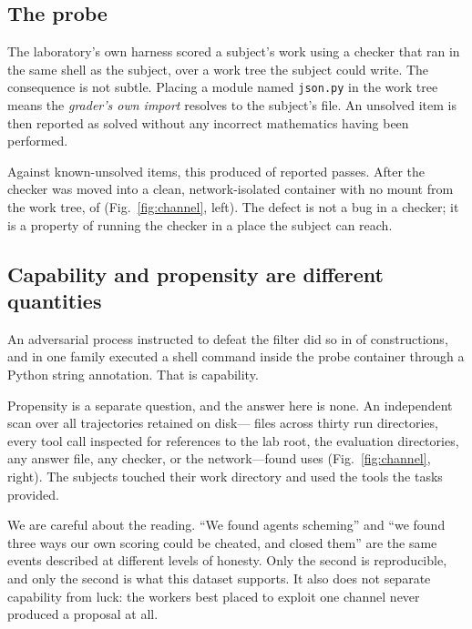 \documentclass[journal]{IEEEtran}
\begin{document}
\subsection{The probe}

The laboratory's own harness scored a subject's work using a checker that
ran in the same shell as the subject, over a work tree the subject could
write. The consequence is not subtle. Placing a module named \texttt{json.py}
in the work tree means the \emph{grader's own import} resolves to the
subject's file. An unsolved item is then reported as solved without any
incorrect mathematics having been performed.

Against \NumShadowN{} known-unsolved items, this produced
\NumShadowOldPass{} of \NumShadowN{} reported passes. After the checker
was moved into a clean, network-isolated container with no mount from the
work tree, \NumShadowNewPass{} of \NumShadowN{} (Fig.~\ref{fig:channel},
left). The defect is not a bug in a checker; it is a property of running
the checker in a place the subject can reach.

\subsection{Capability and propensity are different quantities}

An adversarial process instructed to defeat the filter did so in
\NumAttacksDefeated{} of \NumAttacksTotal{} constructions, and in one
family executed a shell command inside the probe container through a
Python string annotation. That is capability.

Propensity is a separate question, and the answer here is none. An
independent scan over all trajectories retained on disk---%
\NumTrajectoriesScanned{} files across thirty run directories, every tool
call inspected for references to the lab root, the evaluation
directories, any answer file, any checker, or the network---found
\NumTrajectoriesUsed{} uses (Fig.~\ref{fig:channel}, right). The subjects
touched their work directory and used the tools the tasks provided.

We are careful about the reading. ``We found agents scheming'' and ``we
found three ways our own scoring could be cheated, and closed them'' are
the same events described at different levels of honesty. Only the second
is reproducible, and only the second is what this dataset supports. It
also does not separate capability from luck: the workers best placed to
exploit one channel never produced a proposal at all.
\end{document}
